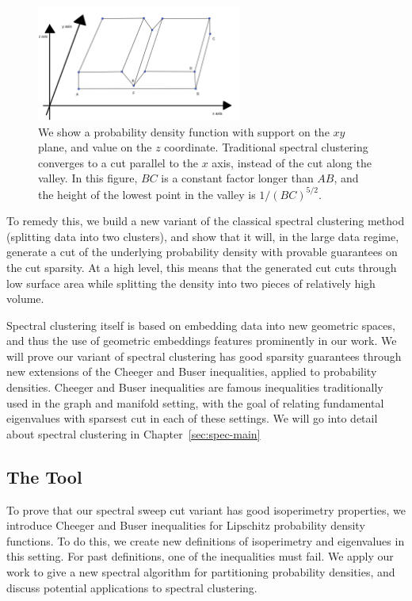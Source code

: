\begin{figure}[htbp]
\centering
\includegraphics[width=0.6\textwidth]{images/counterexample.png}
\caption{
  We show a probability density function with support on the $xy$ plane,
  and value on the $z$ coordinate.  Traditional spectral clustering converges to a cut
  parallel to the $x$ axis, instead of the cut along the valley.
    In this figure,
  $BC$ is a constant
  factor longer than $AB$, and the height of the lowest point in the
  valley is
  $1/(BC)^{5/2}$. 
 }
\label{fig:spec}
\end{figure}

To remedy this, we build a new variant of the classical spectral
clustering method (splitting data into two clusters), and show that it
will, in the large data regime, generate a cut of the underlying probability
density with provable guarantees on the cut sparsity. At a high level,
this means that the generated cut cuts through low surface area while splitting the density into
two pieces of relatively high volume.

Spectral clustering itself is based on embedding data into new geometric
spaces, and thus the use of geometric embeddings features prominently in
our work. We will prove our variant of spectral clustering has good
sparsity guarantees through new extensions of the Cheeger and Buser
inequalities, applied to
probability densities. Cheeger and Buser inequalities are famous
inequalities traditionally used in the graph and manifold setting, with
the goal of relating fundamental eigenvalues with sparsest cut in each
of these settings. We will go into detail about spectral clustering in
Chapter~\ref{sec:spec-main}


\iffalse
\subsection{The Tool}
To prove that our spectral sweep cut variant has good isoperimetry
properties, we introduce Cheeger and Buser inequalities for Lipschitz
probability density functions. To do this, we create new definitions of
isoperimetry and eigenvalues in this setting. For past
definitions, one of the inequalities must fail. We apply our work to
give a new spectral algorithm for partitioning probability densities,
and discuss potential applications to spectral clustering.

